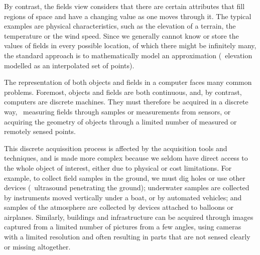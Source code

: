 
By contrast, the fields view considers that there are certain attributes that fill regions of space and have a changing value as one moves through it.
The typical examples are physical characteristics, such as the elevation of a terrain, the temperature or the wind speed.
Since we generally cannot know or store the values of fields in every possible location, of which there might be infinitely many, the standard approach is to mathematically model an approximation (\eg\ elevation modelled as an interpolated set of points).


%

The representation of both objects and fields in a computer faces many common problems. 
Foremost, objects and fields are both continuous, and, by contrast, computers are discrete machines. 
They must therefore be acquired in a discrete way, \eg\ measuring fields through samples or measurements from sensors, or acquiring the geometry of objects through a limited number of measured or remotely sensed points.

This discrete acquissition process is affected by the acquisition tools and techniques, and is made more complex because we seldom have direct access to the whole object of interest, either due to physical or cost limitations.
For example, to collect field samples in the ground, we must dig holes or use other devices (\eg\ ultrasound penetrating the ground); underwater samples are collected by instruments moved vertically under a boat, or by automated vehicles; and samples of the atmosphere are collected by devices attached to balloons or airplanes.
Similarly, buildings and infrastructure can be acquired through images captured from a limited number of pictures from a few angles, using cameras with a limited resolution and often resulting in parts that are not sensed clearly or missing altogether.

